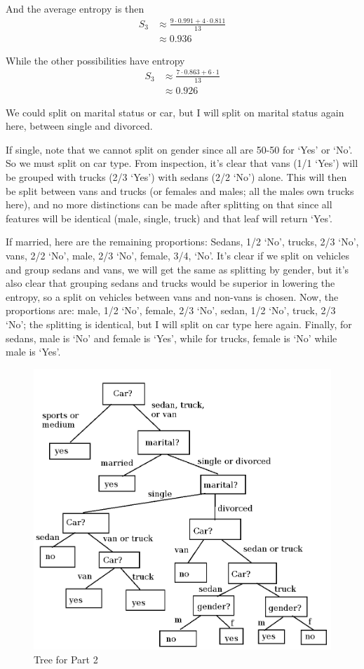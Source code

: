\documentclass{article}
\begin{document}
	\par
	And the average entropy is then
	\begin{align*}
		S_3 &\approx \frac{9\cdot 0.991 + 4\cdot 0.811}{13}\\
		&\approx 0.936
	\end{align*}
	\par
	While the other possibilities have entropy
	\begin{align*}
		S_3 &\approx \frac{7\cdot 0.863 + 6\cdot 1}{13}\\
		&\approx 0.926
	\end{align*}
	\par 
	We could split on marital status or car, but I will split on marital status again here, between single and divorced.
	\par 
	If single, note that we cannot split on gender since all are 50-50 for `Yes' or `No'. So we must split on car type. From inspection, it's clear that vans (1/1 `Yes') will be grouped with trucks (2/3 `Yes') with sedans (2/2 `No') alone. This will then be split between vans and trucks (or females and males; all the males own trucks here), and no more distinctions can be made after splitting on that since all features will be identical (male, single, truck) and that leaf will return `Yes'.
	\par 
	If married, here are the remaining proportions: Sedans, 1/2 `No', trucks, 2/3 `No', vans, 2/2 `No', male, 2/3 `No', female, 3/4, `No'. It's clear if we split on vehicles and group sedans and vans, we will get the same as splitting by gender, but it's also clear that grouping sedans and trucks would be superior in lowering the entropy, so a split on vehicles between vans and non-vans is chosen. Now, the proportions are: male, 1/2 `No', female, 2/3 `No', sedan, 1/2 `No', truck, 2/3 `No'; the splitting is identical, but I will split on car type here again. Finally, for sedans, male is `No' and female is `Yes', while for trucks, female is `No' while male is `Yes'.
	\begin{figure}
		\includegraphics[scale=0.4]{part2tree.png}
		\caption{Tree for Part 2}
	\end{figure}
	
\end{document}
